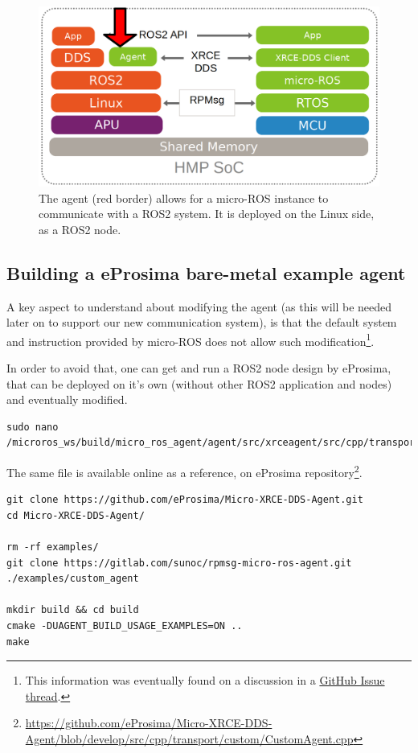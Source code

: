 \documentclass[10pt]{article}
\begin{document}
\begin{figure}[htbp]
\centering
\includegraphics[width=.6\textwidth]{./img/map_agent.png}
\caption{\label{fig:org887e5de}The agent (red border) allows for a micro-ROS instance to communicate with a ROS2 system. It is deployed on the Linux side, as a ROS2 node.}
\end{figure}

\subsection{Building a eProsima bare-metal example agent}
\label{sec:org626474d}
A key aspect to understand about modifying the agent (as
this will be needed later on to support our new communication system),
is that the default system and instruction provided by micro-ROS does not
allow such modification\footnote{This information was eventually found on a discussion in a \href{https://github.com/micro-ROS/micro\_ros\_setup/issues/591}{GitHub Issue thread}.}.

In order to avoid that, one can get and run a ROS2 node design by eProsima,
that can be deployed on it's own (without other ROS2 application and nodes)
and eventually modified.


\begin{verbatim}
sudo nano /microros_ws/build/micro_ros_agent/agent/src/xrceagent/src/cpp/transport/custom/CustomAgent.cpp
\end{verbatim}
The same file is available online as a reference, on eProsima repository\footnote{\url{https://github.com/eProsima/Micro-XRCE-DDS-Agent/blob/develop/src/cpp/transport/custom/CustomAgent.cpp}}.

\begin{verbatim}
git clone https://github.com/eProsima/Micro-XRCE-DDS-Agent.git
cd Micro-XRCE-DDS-Agent/

rm -rf examples/
git clone https://gitlab.com/sunoc/rpmsg-micro-ros-agent.git ./examples/custom_agent

mkdir build && cd build
cmake -DUAGENT_BUILD_USAGE_EXAMPLES=ON ..
make
\end{verbatim}
\end{document}
